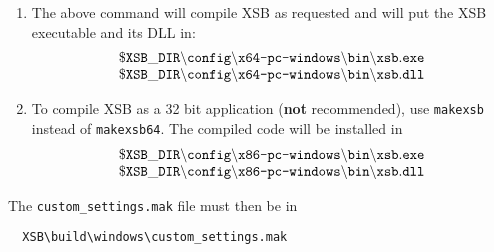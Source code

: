 \begin{enumerate}
\begin{itemize}
    latter is used when you want to compile XSB with debugging enabled.
  \item The {\tt ORACLE} parameter (default is ``no'') compiles XSB with
    native support for Oracle DBMS. If {\tt ORACLE} is
    specified, you {\bf must} also specify the necessary Oracle libraries
    using the parameter {\tt SITE\_LIBS}.
    Native Oracle support is rarely used and ODBC is the recommended way to
    connect to databases.
  \item \texttt{MY\_LIBRARY\_DIRS} is used to specify the external
    libraries and \texttt{libs} there has the form  \texttt{/LIBPATH:"libdir1"
    /LIBPATH:"libdir2" ...}.  
  \item \texttt{MY\_INCLUDE\_DIRS} is used to specify additional
    directories for included files. Here \texttt{opts} has the form
    \texttt{/I"incdir1" /I"incdir2" ...}.  
  \end{itemize}
  Instead of specifying the options on command line,
  it might be more convenient (and more general) to create the file
\begin{verbatim}
  XSB\build\windows64\custom_settings.mak  
\end{verbatim}
  and put the required options there. For instance,
\begin{verbatim}
XSB_INTERPROLOG=yes 
MY_INCLUDE_DIRS=/I"C:\Program Files\Java\jdk1.6.0_26" \
      /I"C:\Program Files\Java\jdk1.6.0_26\win32" 
MY_LIBRARY_DIRS=/LIBPATH:"C:\pthreads\pthreadVC1.lib" /libpath:"C:\oracle"
ORACLE=yes
\end{verbatim}
Make sure you do not misspell the name of that file or else none of the
specified options will take effect!
   
 \item The above command will compile XSB as requested and will put the XSB 
   executable and its DLL in:
\[
\begin{array}{l}
 \tt
 \$XSB\_DIR\backslash{}config\backslash\texttt{x64-pc-windows}\backslash{}bin\backslash{}xsb.exe
\\
 \tt
 \$XSB\_DIR\backslash{}config\backslash\texttt{x64-pc-windows}\backslash{}bin\backslash{}xsb.dll
 \end{array}
\]

\item To compile XSB as a 32 bit application (\textbf{not} recommended),
  use \texttt{makexsb} instead of
  \texttt{makexsb64}. The compiled code will be installed   in
\[
\begin{array}{l}
 \tt
 \$XSB\_DIR\backslash{}config\backslash\texttt{x86-pc-windows}\backslash{}bin\backslash{}xsb.exe
\\
 \tt
 \$XSB\_DIR\backslash{}config\backslash\texttt{x86-pc-windows}\backslash{}bin\backslash{}xsb.dll
 \end{array}
\]
\end{enumerate}
The \texttt{custom\_settings.mak} file must then be in
\begin{verbatim}
  XSB\build\windows\custom_settings.mak  
\end{verbatim}

